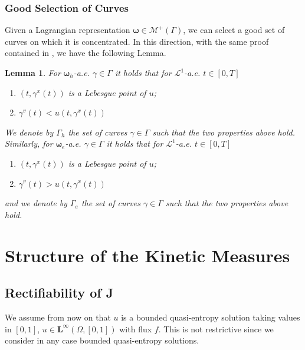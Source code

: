 \documentclass[11pt, twoside, reqno]{amsart}
\newtheorem{lemma}[thm]{Lemma}
\theoremstyle{definition}
\theoremstyle{remark}
\numberwithin{equation}{section}
\newcommand{\bs}[1]{\boldsymbol{#1}}
\newcommand{\msc}[1]{\mathscr{#1}}
\begin{document}
\subsubsection{Good Selection of Curves}
Given a Lagrangian representation $\bs \omega \in \msc M^+(\Gamma)$, we can select a good set of curves on which it is concentrated.  In this direction, with the same proof contained in \cite{marconi_burgers}, we have the following Lemma.
   \begin{lemma}\label{lemma:goodcurves}
       For $\bs \omega_h$-a.e. $\gamma \in \Gamma$ it holds that for $\msc L^1$-a.e. $t \in [0,T]$
       \begin{enumerate}
           \item $(t, \gamma^x(t))$ is a Lebesgue point of $u$;
           \item $\gamma^v(t) < u(t, \gamma^x(t))$
       \end{enumerate}
       We denote by $\Gamma_h$ the set of curves $\gamma \in \Gamma$ such that the two properties above hold. Similarly, for $\bs \omega_e$-a.e. $\gamma \in \Gamma$ it holds that for $\msc L^1$-a.e. $t \in [0,T]$
       \begin{enumerate}
           \item $(t, \gamma^x(t))$ is a Lebesgue point of $u$;
           \item $\gamma^v(t) > u(t, \gamma^x(t))$
       \end{enumerate}
       and we denote by $\Gamma_e$ the set of curves $\gamma \in \Gamma$ such that the two properties above hold. 
\end{lemma}




\section{Structure of the Kinetic Measures}\label{sec:structurekm}
\subsection{Rectifiability of J}
We assume from now on that $u$ is a bounded quasi-entropy solution taking values in $[0,1]$, $u \in \mathbf L^\infty(\Omega, [0,1])$ with flux $f$. This is not restrictive since we consider in any case bounded quasi-entropy solutions.
\end{document}
